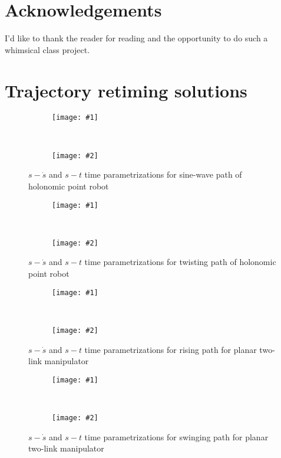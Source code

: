 \documentclass[letterpaper,12pt]{article} %
\newcommand{\ffigdoublevert}[4]{
    \begin{figure}[h!]
    \centering

    \begin{subfigure}[t!]{0.7\linewidth}
    \texttt{[image: \#1]}
    \caption{}
    \label{fig:#4L}
    \end{subfigure}
    ~
    \begin{subfigure}[b!]{0.7\linewidth}
    \texttt{[image: \#2]}
    \caption{}
    \label{fig:#4R}
    \end{subfigure}

    \caption{#3}
    \label{fig:#4}
    \end{figure}
}
\begin{document}
\section{Acknowledgements}

I'd like to thank the reader for reading and the opportunity to do such a whimsical class project.






\newpage
\appendix
\section{Trajectory retiming solutions}

\ffigdoublevert{pics/plans/trans1}{pics/plans/trans2}{$s-\dot{s}$ and $s-t$ time parametrizations for sine-wave path of holonomic point robot}{a1}
\ffigdoublevert{pics/plans/twist1}{pics/plans/twist2}{$s-\dot{s}$ and $s-t$ time parametrizations for twisting path of holonomic point robot}{a2}
\ffigdoublevert{pics/plans/raise1}{pics/plans/raise2}{$s-\dot{s}$ and $s-t$ time parametrizations for rising path for planar two-link manipulator}{a3}
\ffigdoublevert{pics/plans/swing1}{pics/plans/swing2}{$s-\dot{s}$ and $s-t$ time parametrizations for swinging path for planar two-link manipulator}{a4}

\end{document}
